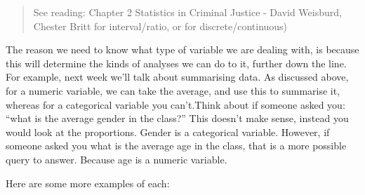 \documentclass[
]{book}
\begin{document}
\begin{quote}
See reading: Chapter 2 Statistics in Criminal Justice - David Weisburd, Chester Britt for interval/ratio, or for discrete/continuous)
\end{quote}

The reason we need to know what type of variable we are dealing with, is because this will determine the kinds of analyses we can do to it, further down the line. For example, next week we'll talk about summarising data. As discussed above, for a numeric variable, we can take the average, and use this to summarise it, whereas for a categorical variable you can't.Think about if someone asked you: ``what is the average gender in the class?'' This doesn't make sense, instead you would look at the proportions. Gender is a categorical variable. However, if someone asked you what is the average age in the class, that is a more possible query to answer. Because age is a numeric variable.

Here are some more examples of each:
\end{document}
